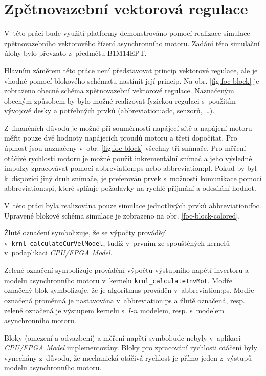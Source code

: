 \documentclass[a4paper, twoside, 11pt]{article}
\begin{document}
\section{Zpětnovazební vektorová regulace}
	V~této práci bude využití platformy demonstrováno pomocí realizace simulace zpětnovazebního vektorového řízení asynchronního motoru. Zadání této simulační úlohy bylo převzato z~předmětu B1M14EPT. \cite{lipcak-bauer-ept-moodle}\par
	Hlavním záměrem této práce není představovat princip vektorové regulace, ale je vhodné pomocí blokového schématu nastínit její princip. Na obr. \ref{fig:foc-block} je zobrazeno obecné schéma zpětnovazební vektorové regulace. Naznačeným obecným způsobem by bylo možné realizovat fyzickou regulaci s~použitím vývojové desky a potřebných prvků (\gls{abbreviation:adc}, senzorů, \dots).\par
	Z~finančních důvodů je možné při souměrnosti napájecí sítě a napájení motoru měřit pouze dvě hodnoty napájecích proudů motoru a třetí dopočítat. Pro úplnost jsou naznačeny v~obr. \ref{fig:foc-block} všechny tři snímače. Pro měření otáčivé rychlosti motoru je možné použít inkrementální snímač a jeho výsledné impulzy zpracovávat pomocí \gls{abbreviation:ps} nebo \gls{abbreviation:pl}. Pokud by byl k~dispozici jiný druh snímače, je preferován prvek s~možností komunikace pomocí \gls{abbreviation:spi}, které splňuje požadavky na rychlé příjmání a odesílání hodnot.\par
	V~této práci byla realizována pouze simulace jednotlivých prvků \gls{abbreviation:foc}. Upravené blokové schéma simulace je zobrazeno na obr. \ref{foc-block-colored}.\par
	\textcolor{ctuyellow}{Žluté označení} symbolizuje, že se výpočty provádějí v~\texttt{krnl\_calculateCurVelModel}, tudíž v~prvním ze spouštěných kernelů v~podaplikaci \hyperref[subsec:cpu-fpga]{\textit{CPU/FPGA Model}}.\par
	\textcolor{ctugreen}{Zelené označení} symbolizuje provádění výpočtů výstupního napětí invertoru a modelu asynchronního motoru v~kernelu \texttt{krnl\_calculateInvMot}. \textcolor{ctublue}{Modře označený} blok symbolizuje, že je algoritmus prováděn v~\gls{abbreviation:ps}. \textcolor{ctublue}{Modře označená} proměnná je nastavována v~\gls{abbreviation:ps} a \textcolor{ctuyellow}{žlutě označená}, resp. \textcolor{ctugreen}{zeleně označená} je výstupem kernelu s~$I$-$n$ modelem, resp. s~modelem asynchronního motoru.\par
	Bloky (omezení a odvazbení) a měření napětí \gls{symbol:udc} nebyly v~aplikaci \hyperref[subsec:cpu-fpga]{\textit{CPU/FPGA Model}} implementovány. Bloky pro zpracování rychlosti otáčení byly vynechány z~důvodu, že mechanická otáčivá rychlost je přímo jeden z~výstupů modelu asynchronního motoru.
\end{document}
